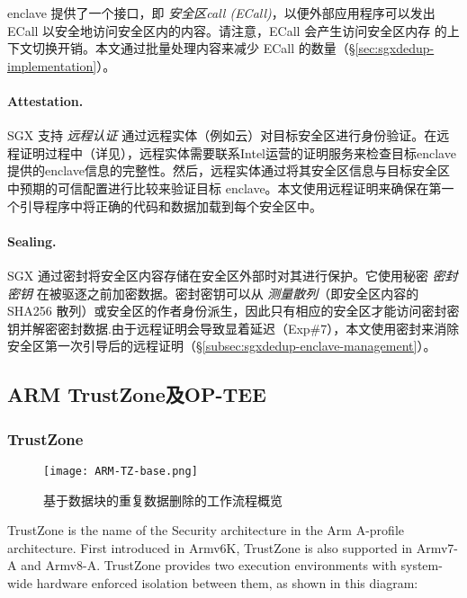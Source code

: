 enclave 提供了一个接口，即 \textit{安全区call (ECall)}，以便外部应用程序可以发出 ECall 以安全地访问安全区内的内容。请注意，ECall 会产生访问安全区内存 \cite{harnik18} 的上下文切换开销。本文通过批量处理内容来减少 ECall 的数量（\S\ref{sec:sgxdedup-implementation}）。

\paragraph*{Attestation.} SGX 支持 \textit{ 远程认证} 通过远程实体（例如云）对目标安全区进行身份验证。在远程证明过程中（详见\cite{sgx}），远程实体需要联系Intel运营的证明服务来检查目标enclave提供的enclave信息的完整性。然后，远程实体通过将其安全区信息与目标安全区中预期的可信配置进行比较来验证目标 enclave。本文使用远程证明来确保在第一个引导程序中将正确的代码和数据加载到每个安全区中。

\paragraph*{Sealing.} SGX 通过密封将安全区内容存储在安全区外部时对其进行保护。它使用秘密 \textit{ 密封密钥} 在被驱逐之前加密数据。密封密钥可以从 \textit{ 测量散列}（即安全区内容的 SHA256 散列）或安全区的作者身份派生，因此只有相应的安全区才能访问密封密钥并解密密封数据.由于远程证明会导致显着延迟（Exp\#7），本文使用密封来消除安全区第一次引导后的远程证明（\S\ref{subsec:sgxdedup-enclave-management}）。

\subsection{ARM TrustZone及OP-TEE}
\label{subsec:background-tee-tz}

\subsubsection{TrustZone}
\begin{figure}[!htb]
    \small
    \centering
    \texttt{[image: ARM-TZ-base.png]}
    \caption{基于数据块的重复数据删除的工作流程概览} 
    \label{fig:重复数据删除的工作流程概览}
\end{figure}


TrustZone is the name of the Security architecture in the Arm A-profile architecture. First introduced in Armv6K, TrustZone is also supported in Armv7-A and Armv8-A. TrustZone provides two execution environments with system-wide hardware enforced isolation between them, as shown in this diagram:

